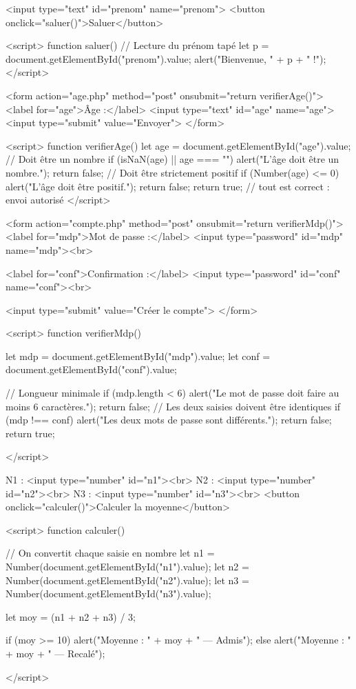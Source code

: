 \begin{codehtml}
<input type="text" id="prenom" name="prenom">
<button onclick="saluer()">Saluer</button>

<script>
  function saluer() {
    // Lecture du prénom tapé
    let p = document.getElementById("prenom").value;
    alert("Bienvenue, " + p + " !");
  }
</script>
\end{codehtml}

\begin{codehtml}
<form action="age.php" method="post" onsubmit="return verifierAge()">
  <label for="age">Âge :</label>
  <input type="text" id="age" name="age">
  <input type="submit" value="Envoyer">
</form>

<script>
  function verifierAge() {
    let age = document.getElementById("age").value;
    // Doit être un nombre
    if (isNaN(age) || age === "") {
      alert("L'âge doit être un nombre.");
      return false;
    }
    // Doit être strictement positif
    if (Number(age) <= 0) {
      alert("L'âge doit être positif.");
      return false;
    }
    return true;   // tout est correct : envoi autorisé
  }
</script>
\end{codehtml}

\begin{codehtml}
<form action="compte.php" method="post" onsubmit="return verifierMdp()">
  <label for="mdp">Mot de passe :</label>
  <input type="password" id="mdp" name="mdp"><br>

  <label for="conf">Confirmation :</label>
  <input type="password" id="conf" name="conf"><br>

  <input type="submit" value="Créer le compte">
</form>

<script>
  function verifierMdp() {
    let mdp = document.getElementById("mdp").value;
    let conf = document.getElementById("conf").value;

    // Longueur minimale
    if (mdp.length < 6) {
      alert("Le mot de passe doit faire au moins 6 caractères.");
      return false;
    }
    // Les deux saisies doivent être identiques
    if (mdp !== conf) {
      alert("Les deux mots de passe sont différents.");
      return false;
    }
    return true;
  }
</script>
\end{codehtml}

\begin{codehtml}
N1 : <input type="number" id="n1"><br>
N2 : <input type="number" id="n2"><br>
N3 : <input type="number" id="n3"><br>
<button onclick="calculer()">Calculer la moyenne</button>

<script>
  function calculer() {
    // On convertit chaque saisie en nombre
    let n1 = Number(document.getElementById("n1").value);
    let n2 = Number(document.getElementById("n2").value);
    let n3 = Number(document.getElementById("n3").value);

    let moy = (n1 + n2 + n3) / 3;

    if (moy >= 10) {
      alert("Moyenne : " + moy + " — Admis");
    } else {
      alert("Moyenne : " + moy + " — Recalé");
    }
  }
</script>
\end{codehtml}

